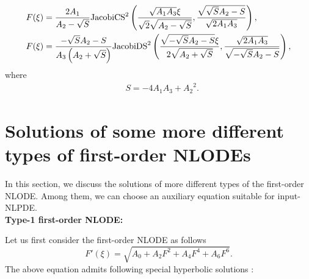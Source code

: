 \documentclass[prd,aps,floats,showkeys,nofootinbib,notitlepage]{revtex4}
\begin{document}
\begin{subequations}
\begin{align}
			&F(\xi)=   \frac{{2{A_1}}}{{{A_2} - \sqrt S }}{\text{JacobiC}}{{\text{S}}^2}\left( {\frac{{\sqrt {{A_1} {A_3}} \xi }}{{\sqrt 2 \sqrt {{A_2} - \sqrt S } }}, \frac{{\sqrt {\sqrt S {A_2} - S}  }}{{\sqrt {2{A_1} {A_3}} }}} \right), \hfill \\
			&F(\xi)=   \frac{{ - \sqrt S {A_2} - S}}{{{A_3}\left( {{A_2} + \sqrt S } \right)}}{\text{JacobiD}}{{\text{S}}^2}\left( {\frac{{\sqrt { - \sqrt S {A_2} - S} \xi }}{{2\sqrt {{A_2} + \sqrt S } }},\frac{{ \sqrt {2{A_1} {A_3}} }}{{\sqrt { - \sqrt S {A_2} - S} }}} \right),
		\end{align}
	\end{subequations}
	where
	\begin{align}  
		&S =  - 4 {A_1} {A_3} + {A_2}^2.
	\end{align}
	
	\renewcommand{\theequation}{D-\arabic{equation}}
	\section{Solutions of some more different types of first-order NLODEs}\label{sec:appenD}
	In this section, we discuss the solutions of more different types of the first-order NLODE. Among them, we can choose an auxiliary equation suitable for input-NLPDE.\\ 
	\textbf{Type-1 first-order NLODE:}
	\par Let us first consider the first-order NLODE as follows 
	\begin{equation}\label{0246}
		F'(\xi ) = \sqrt{{A_0} + {A_2}{F^2} + {A_4}{F^4} + {A_6}{F^6}}.
	\end{equation}
	The above equation admits following special hyperbolic solutions \cite{0246}:
	
\end{document}
